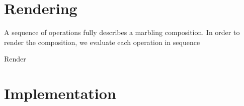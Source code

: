 \documentclass{article}
\begin{document}
\section{Rendering}

A sequence of operations fully describes a marbling composition. In order to render the composition, we evaluate each operation in sequence

\begin{algorithm}
	\caption{Render}
	\label{alg:update}
	\begin{algorithmic}[1] %
		
		
		\EndProcedure
	\end{algorithmic}
\end{algorithm}

\section{Implementation}





\end{document}

